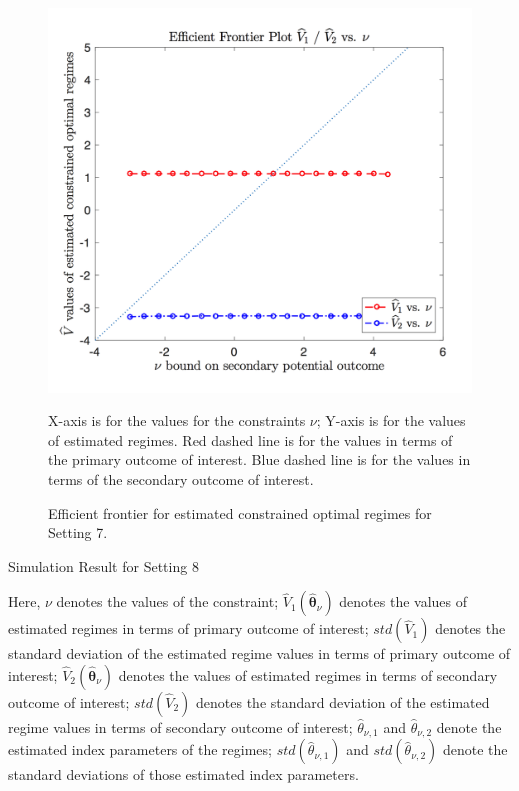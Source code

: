 \documentclass{article}
\newcommand{\wh}{\widehat}
\newcommand{\bs}{ \boldsymbol}
\begin{document}
\begin{appendices}
\begin{figure}[!htb]
	\centering
	\includegraphics[width=.9\linewidth]{./figs/efficient_plot7.png}
	\caption{Efficient frontier for estimated constrained optimal regimes for Setting 7.}
	\label{fig:7}
	\justify
X-axis is for the values for the constraints $\nu$; Y-axis is for the values of estimated regimes. Red dashed line is for the values in terms of the primary outcome of interest. Blue dashed line is for the values in terms of the secondary outcome of interest.
\end{figure}
\begin{table}[!htbp]
	\caption {Simulation Result for Setting 8}
	\centering
	{\tt
		
	}
	\justify
	Here, $\nu$ denotes the values of the constraint; $\wh{V}_1(\wh{\bs{\theta}}_{\nu})$ denotes the values of estimated regimes in terms of primary outcome of interest; $std(\wh{V}_1)$ denotes the standard deviation of the estimated regime values in terms of primary outcome of interest; $\wh{V}_2(\wh{\bs{\theta}}_{\nu})$ denotes the values of estimated regimes in terms of secondary outcome of interest; $std(\wh{V}_2)$ denotes the standard deviation of the estimated regime values in terms of secondary outcome of interest; $\wh{\theta}_{\nu,1}$ and $\wh{\theta}_{\nu,2}$ denote the estimated index parameters of the regimes; $std(\wh{\theta}_{\nu,1})$ and $std(\wh{\theta}_{\nu,2})$ denote the standard deviations of those estimated index parameters.	
\end{table} 
\begin{figure}[!htb]
	\centering

\end{figure}
\end{appendices}
\end{document}
